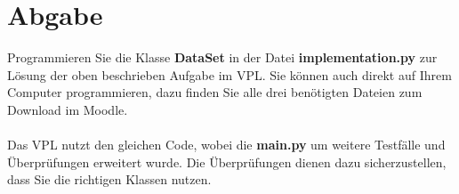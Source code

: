 \documentclass[
 12pt, %
 a4paper, %
 parskip=full %
]{scrartcl}
\begin{document}
\section{Abgabe}
Programmieren Sie die Klasse \textbf{DataSet} in der Datei \textbf{implementation.py} zur Lösung der oben beschrieben Aufgabe im VPL.
Sie können auch direkt auf Ihrem Computer programmieren, dazu finden Sie alle drei benötigten Dateien zum Download im Moodle.\\
\\
Das VPL nutzt den gleichen Code, wobei die \textbf{main.py} um weitere Testfälle und Überprüfungen erweitert wurde.
Die Überprüfungen dienen dazu sicherzustellen, dass Sie die richtigen Klassen nutzen.\\
%
\end{document}
